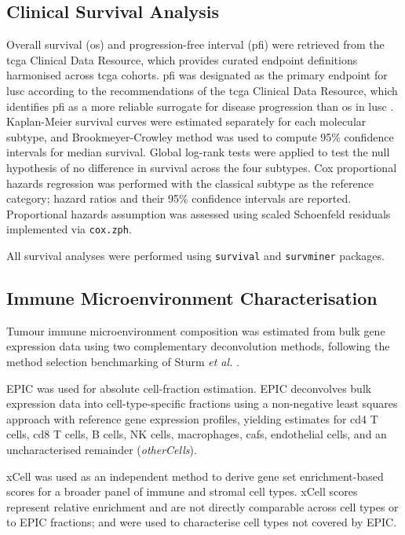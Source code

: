 \subsection{Clinical Survival Analysis}
\label{sec:clinical_method}

Overall survival (\gls{os}) and progression-free interval (\gls{pfi}) were retrieved from the \gls{tcga} Clinical Data Resource, which provides curated endpoint definitions harmonised across \gls{tcga} cohorts. \gls{pfi} was designated as the primary endpoint for \gls{lusc} according to the recommendations of the \gls{tcga} Clinical Data Resource, which identifies \gls{pfi} as a more reliable surrogate for disease progression than \gls{os} in \gls{lusc} \parencite{Liu2018integrated}. Kaplan-Meier survival curves were estimated separately for each molecular subtype, and Brookmeyer-Crowley method was used to compute 95\% confidence intervals for median survival. Global log-rank tests were applied to test the null hypothesis of no difference in survival across the four subtypes. Cox proportional hazards regression was performed with the classical subtype as the reference category; hazard ratios and their 95\% confidence intervals are reported. Proportional hazards assumption was assessed using scaled Schoenfeld residuals implemented via \texttt{cox.zph}. 

All survival analyses were performed using \texttt{survival} and \texttt{survminer} packages.

\subsection{Immune Microenvironment Characterisation}
\label{sec:tme_method}

Tumour immune microenvironment composition was estimated from bulk gene expression data using two complementary deconvolution methods, following the method selection benchmarking of Sturm \textit{et al.} \parencite{Sturm2019}.


EPIC \parencite{Racle2017} was used for absolute cell-fraction estimation. EPIC deconvolves bulk expression data into cell-type-specific fractions using a non-negative least squares approach with reference gene expression profiles, yielding estimates for \gls{cd4} T cells, \gls{cd8} T cells, B cells, NK cells, macrophages, \gls{caf}s, endothelial cells, and an uncharacterised remainder (\textit{otherCells}).
 
xCell \parencite{Aran2017-xcell} was used as an independent method to derive gene set enrichment-based scores for a broader panel of immune and stromal cell types. xCell scores represent relative enrichment and are not directly comparable across cell types or to EPIC fractions; and were used to characterise cell types not covered by EPIC.
 
